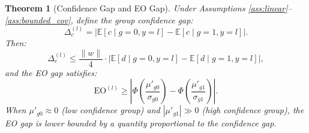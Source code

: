 \documentclass[11pt]{article}
\newtheorem{theorem}{Theorem}
\begin{document}
\begin{theorem}[Confidence Gap and EO Gap]
    \label{thm:conf_eo}
    Under Assumptions \ref{ass:linear}--\ref{ass:bounded_cov}, define the group confidence gap:
    \begin{equation}
        \Delta_c^{(l)} = \left|\mathbb{E}[c \mid g=0, y=l] - \mathbb{E}[c \mid g=1, y=l]\right|.
    \end{equation}
    Then:
    \begin{equation}
        \Delta_c^{(l)} \leq \frac{\|w\|}{4} \cdot \left|\mathbb{E}[d \mid g=0, y=l] - \mathbb{E}[d \mid g=1, y=l]\right|,
    \end{equation}
    and the EO gap satisfies:
    \begin{equation}
        \mathrm{EO}^{(l)} \geq \left|\Phi\!\left(\frac{\mu'_{g0}}{\sigma_{g0}}\right) - \Phi\!\left(\frac{\mu'_{g1}}{\sigma_{g1}}\right)\right|.
    \end{equation}
    When $\mu'_{g0} \approx 0$ (low confidence group) and $|\mu'_{g1}| \gg 0$ (high confidence group), the EO gap is lower bounded by a quantity proportional to the confidence gap.
\end{theorem}
\end{document}
